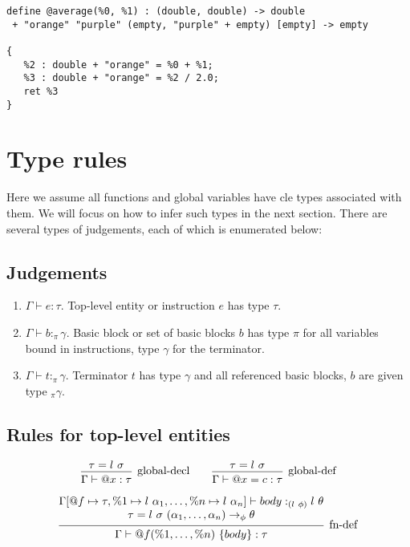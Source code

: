\documentclass{article}
\begin{document}
\begin{verbatim}
define @average(%0, %1) : (double, double) -> double
 + "orange" "purple" (empty, "purple" + empty) [empty] -> empty
      
{
   %2 : double + "orange" = %0 + %1;
   %3 : double + "orange" = %2 / 2.0;
   ret %3
}
\end{verbatim}

\section{Type rules}
Here we assume all functions and global variables have cle types associated with them.  We will focus on how to infer such types in the next section.
There are several types of judgements, each of which is enumerated below:

\subsection{Judgements}
\begin{enumerate}
    \item $\Gamma \vdash e : \tau$. 
    Top-level entity or instruction $e$ has type $\tau$. 
    \item $\Gamma \vdash b :_\pi \gamma$. 
    Basic block or set of basic blocks $b$ has type $\pi$ for all variables bound in instructions, type $\gamma$ for the terminator.
    \item $\Gamma \vdash t :_\pi \gamma$. 
    Terminator $t$ has type $\gamma$ and all referenced basic blocks, $b$ are given type $_\pi \gamma$.
\end{enumerate}

\subsection{Rules for top-level entities}

\[    
\begin{prooftree}
    \hypo{\tau = l\ \sigma}
    \infer1[global-decl]{\Gamma \vdash @x : \tau}
\end{prooftree}
\qquad
\begin{prooftree}
    \hypo{\tau = l\ \sigma}
    \infer1[global-def]{\Gamma \vdash @x = c : \tau}
\end{prooftree}
\]

\[
\begin{prooftree}
    \hypo{
    \begin{matrix}
        \Gamma[@f \mapsto \tau, \%1 \mapsto l\ \alpha_1, \ldots, \%n \mapsto l\ \alpha_n] \vdash body :_{(l\ \phi)} l\ \theta \\
        \tau = l\ \sigma\ (\alpha_1, \dots, \alpha_n) \rightarrow_\phi \theta
    \end{matrix}
    }
    \infer1[fn-def]{\Gamma \vdash @f(\%1, \dots, \%n)\ \{ body \} : \tau}
    
\end{prooftree}
\]
\end{document}
